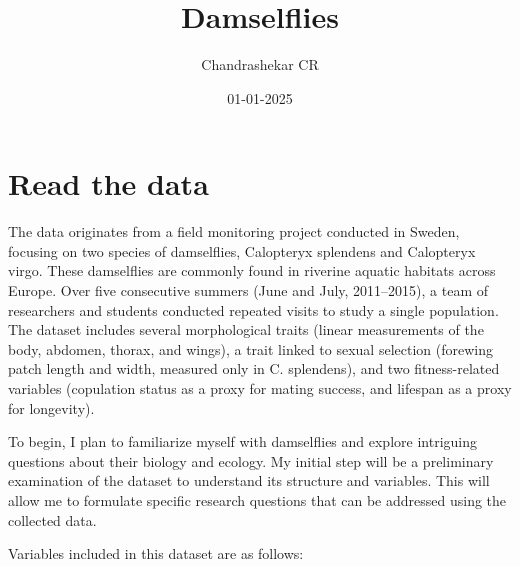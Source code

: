 \documentclass[
]{article}
\title{Damselflies}
\author{Chandrashekar CR}
\date{01-01-2025}
\begin{document}
\maketitle

\hypertarget{read-the-data}{%
\section{Read the data}\label{read-the-data}}

The data originates from a field monitoring project conducted in Sweden,
focusing on two species of damselflies, Calopteryx splendens and
Calopteryx virgo. These damselflies are commonly found in riverine
aquatic habitats across Europe. Over five consecutive summers (June and
July, 2011--2015), a team of researchers and students conducted repeated
visits to study a single population. The dataset includes several
morphological traits (linear measurements of the body, abdomen, thorax,
and wings), a trait linked to sexual selection (forewing patch length
and width, measured only in C. splendens), and two fitness-related
variables (copulation status as a proxy for mating success, and lifespan
as a proxy for longevity).

To begin, I plan to familiarize myself with damselflies and explore
intriguing questions about their biology and ecology. My initial step
will be a preliminary examination of the dataset to understand its
structure and variables. This will allow me to formulate specific
research questions that can be addressed using the collected data.

Variables included in this dataset are as follows:
\end{document}
